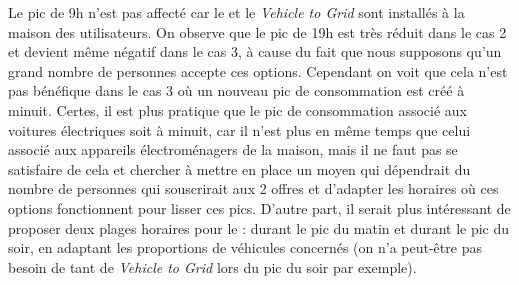 				Le pic de 9h n’est pas affecté car le \smartgrid{} et le \emph{Vehicle to Grid} sont installés à la maison des utilisateurs. On observe que le pic de 19h est très réduit dans le cas 2 et devient même négatif dans le cas 3, à cause du fait que nous supposons qu’un grand nombre de personnes accepte ces options. Cependant on voit que cela n’est pas bénéfique dans le cas 3 où un nouveau pic de consommation est créé à minuit. Certes, il est plus pratique que le pic de consommation associé aux voitures électriques soit à minuit, car il n’est plus en même temps que celui associé aux appareils électroménagers de la maison, mais il ne faut pas se satisfaire de cela et chercher à mettre en place un moyen qui dépendrait du nombre de personnes qui souscrirait aux 2 offres et d’adapter les horaires où ces options fonctionnent pour lisser ces pics. D'autre part, il serait plus intéressant de proposer deux plages horaires pour le \smartgrid{}: durant le pic du matin et durant le pic du soir, en adaptant les proportions de véhicules concernés (on n'a peut-être pas besoin de tant de \emph{Vehicle to Grid} lors du pic du soir par exemple).

		
